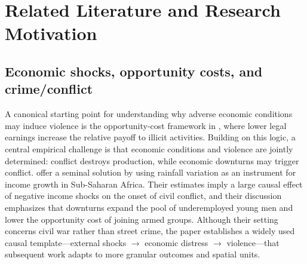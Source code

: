 
\section{Related Literature and Research Motivation}
\label{sec:lit_motivation}

\subsection{Economic shocks, opportunity costs, and crime/conflict}
\label{subsec:econ_shocks_crime}

A canonical starting point for understanding why adverse economic conditions may induce violence is the opportunity-cost framework in \citet{becker1968crime}, where lower legal earnings increase the relative payoff to illicit activities. Building on this logic, a central empirical challenge is that economic conditions and violence are jointly determined: conflict destroys production, while economic downturns may trigger conflict. \citet{miguel2004economic} offer a seminal solution by using rainfall variation as an instrument for income growth in Sub-Saharan Africa. Their estimates imply a large causal effect of negative income shocks on the onset of civil conflict, and their discussion emphasizes that downturns expand the pool of underemployed young men and lower the opportunity cost of joining armed groups. Although their setting concerns civil war rather than street crime, the paper establishes a widely used causal template---external shocks $\rightarrow$ economic distress $\rightarrow$ violence---that subsequent work adapts to more granular outcomes and spatial units.

